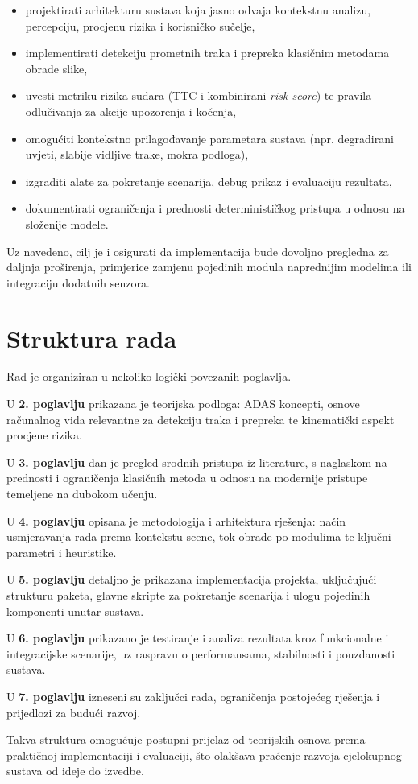 \begin{itemize}
    \item projektirati arhitekturu sustava koja jasno odvaja kontekstnu analizu, percepciju, procjenu rizika i korisničko sučelje,
    \item implementirati detekciju prometnih traka i prepreka klasičnim metodama obrade slike,
    \item uvesti metriku rizika sudara (TTC i kombinirani \textit{risk score}) te pravila odlučivanja za akcije upozorenja i kočenja,
    \item omogućiti kontekstno prilagođavanje parametara sustava (npr. degradirani uvjeti, slabije vidljive trake, mokra podloga),
    \item izgraditi alate za pokretanje scenarija, debug prikaz i evaluaciju rezultata,
    \item dokumentirati ograničenja i prednosti determinističkog pristupa u odnosu na složenije modele.
\end{itemize}

Uz navedeno, cilj je i osigurati da implementacija bude dovoljno pregledna za daljnja proširenja, primjerice zamjenu pojedinih modula naprednijim modelima ili integraciju dodatnih senzora.

\section{Struktura rada}
Rad je organiziran u nekoliko logički povezanih poglavlja.

U \textbf{2. poglavlju} prikazana je teorijska podloga: ADAS koncepti, osnove računalnog vida relevantne za detekciju traka i prepreka te kinematički aspekt procjene rizika.

U \textbf{3. poglavlju} dan je pregled srodnih pristupa iz literature, s naglaskom na prednosti i ograničenja klasičnih metoda u odnosu na modernije pristupe temeljene na dubokom učenju.

U \textbf{4. poglavlju} opisana je metodologija i arhitektura rješenja: način usmjeravanja rada prema kontekstu scene, tok obrade po modulima te ključni parametri i heuristike.

U \textbf{5. poglavlju} detaljno je prikazana implementacija projekta, uključujući strukturu paketa, glavne skripte za pokretanje scenarija i ulogu pojedinih komponenti unutar sustava.

U \textbf{6. poglavlju} prikazano je testiranje i analiza rezultata kroz funkcionalne i integracijske scenarije, uz raspravu o performansama, stabilnosti i pouzdanosti sustava.

U \textbf{7. poglavlju} izneseni su zaključci rada, ograničenja postojećeg rješenja i prijedlozi za budući razvoj.

Takva struktura omogućuje postupni prijelaz od teorijskih osnova prema praktičnoj implementaciji i evaluaciji, što olakšava praćenje razvoja cjelokupnog sustava od ideje do izvedbe.